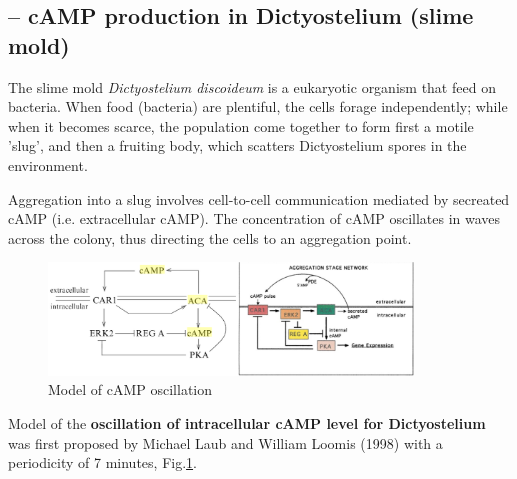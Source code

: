 \subsection{-- cAMP production in Dictyostelium (slime mold)}
\label{sec:cAMP-production-Dictyostelium}
\label{sec:Dictyostelium}

The slime mold {\it Dictyostelium discoideum} is a eukaryotic organism that feed
on bacteria. When food (bacteria) are plentiful, the cells forage independently;
while when it becomes scarce, the population come together to form first a
motile 'slug', and then a fruiting body, which scatters Dictyostelium spores in
the environment.

Aggregation into a slug involves cell-to-cell communication mediated by
secreated cAMP (i.e. extracellular cAMP). The concentration of cAMP oscillates
in waves across the colony, thus directing the cells to an aggregation point.

\begin{figure}[hbt]
 \centerline{\includegraphics[height=3cm]{./images/cAMP-oscillation-Dictyostelium.eps}}
 \caption{Model of cAMP oscillation}
\label{fig:cAMP-oscillation-Dictyostelium}
\end{figure}

Model of the {\bf oscillation of intracellular cAMP level for Dictyostelium} was
first proposed by Michael Laub and William Loomis (1998) with a periodicity of 7
minutes, Fig.\ref{fig:cAMP-oscillation-Dictyostelium}. 

